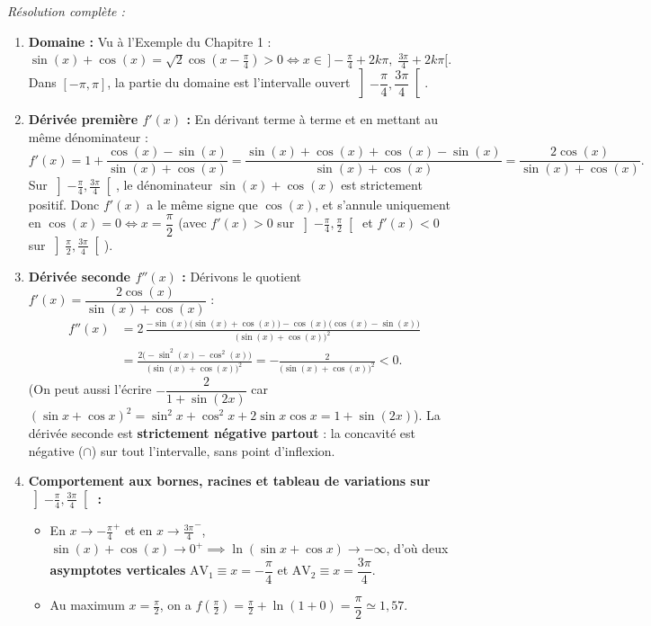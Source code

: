 \begin{exemple}
\emph{Résolution complète :}
\begin{enumerate}[label=\alph*)]
    \item \textbf{Domaine :} Vu à l'Exemple du Chapitre 1 : $\sin(x) + \cos(x) = \sqrt{2}\cos\left(x - \frac{\pi}{4}\right) > 0 \iff x \in \,]-\frac{\pi}{4} + 2k\pi,\; \frac{3\pi}{4} + 2k\pi[$. Dans $[-\pi, \pi]$, la partie du domaine est l'intervalle ouvert $\left]-\dfrac{\pi}{4}, \dfrac{3\pi}{4}\right[$.
    \item \textbf{Dérivée première $f'(x)$ :} En dérivant terme à terme et en mettant au même dénominateur :
    \[
        f'(x) = 1 + \frac{\cos(x) - \sin(x)}{\sin(x) + \cos(x)} = \frac{\sin(x) + \cos(x) + \cos(x) - \sin(x)}{\sin(x) + \cos(x)} = \boxed{\frac{2\cos(x)}{\sin(x) + \cos(x)}}.
    \]
    Sur $\left]-\frac{\pi}{4}, \frac{3\pi}{4}\right[$, le dénominateur $\sin(x) + \cos(x)$ est strictement positif. Donc $f'(x)$ a le même signe que $\cos(x)$, et s'annule uniquement en $\cos(x) = 0 \iff \boxed{x = \dfrac{\pi}{2}}$ (avec $f'(x) > 0$ sur $\left]-\frac{\pi}{4}, \frac{\pi}{2}\right[$ et $f'(x) < 0$ sur $\left]\frac{\pi}{2}, \frac{3\pi}{4}\right[$).
    \item \textbf{Dérivée seconde $f''(x)$ :} Dérivons le quotient $f'(x) = \dfrac{2\cos(x)}{\sin(x)+\cos(x)}$ :
    \begin{align*}
        f''(x) &= 2\,\frac{-\sin(x)\bigl(\sin(x)+\cos(x)\bigr) - \cos(x)\bigl(\cos(x)-\sin(x)\bigr)}{\bigl(\sin(x)+\cos(x)\bigr)^2} \\
        &= \frac{2\bigl(-\sin^2(x) - \cos^2(x)\bigr)}{\bigl(\sin(x)+\cos(x)\bigr)^2} = \boxed{-\frac{2}{\bigl(\sin(x)+\cos(x)\bigr)^2} < 0}.
    \end{align*}
    (On peut aussi l'écrire $-\dfrac{2}{1 + \sin(2x)}$ car $(\sin x + \cos x)^2 = \sin^2 x + \cos^2 x + 2\sin x\cos x = 1 + \sin(2x)$).
    La dérivée seconde est \textbf{strictement négative partout} : la concavité est négative ($\cap$) sur tout l'intervalle, sans point d'inflexion.
    \item \textbf{Comportement aux bornes, racines et tableau de variations sur $\left]-\frac{\pi}{4}, \frac{3\pi}{4}\right[$ :}
    \begin{itemize}
        \item En $x \to -\frac{\pi}{4}^+$ et en $x \to \frac{3\pi}{4}^-$, $\sin(x) + \cos(x) \to 0^+ \implies \ln(\sin x + \cos x) \to -\infty$, d'où deux \textbf{asymptotes verticales} $\text{AV}_1 \equiv x = -\dfrac{\pi}{4}$ et $\text{AV}_2 \equiv x = \dfrac{3\pi}{4}$.
        \item Au maximum $x = \frac{\pi}{2}$, on a $f\left(\frac{\pi}{2}\right) = \frac{\pi}{2} + \ln(1 + 0) = \dfrac{\pi}{2} \simeq 1,57$.

\end{itemize}
\end{enumerate}
\end{exemple}
